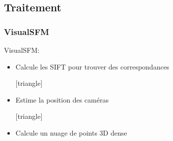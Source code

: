 	  
	  
	  
	  \subsection{Traitement}
	  
	  \begin{frame}
	  \frametitle{VisualSFM}
	   VisualSFM:
	  \begin{itemize}
	    [triangle]
	    \item Calcule les SIFT pour trouver des correspondances
	    
	    [triangle]
	    \item Estime la position des caméras
	    
	    [triangle]
	    \item Calcule un nuage de points 3D dense
	    \end{itemize}
	    

	  \end{frame}
	  	  
	  
